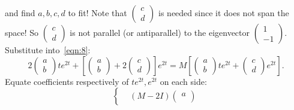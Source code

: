 \documentclass[12pt]{report}
\theoremstyle{definition}
\begin{document}
\begin{ex}
\begin{enumerate}[label = (\roman*)]
\[                \]and find $a, b, c, d$ to  fit!
                Note that $\begin{pmatrix}
                        c \\
                        d
                \end{pmatrix}$ is needed since it does not span the space!
                So $\begin{pmatrix}
                        c \\
                        d
                    \end{pmatrix}$ is not parallel (or antiparallel) to the eigenvector $\begin{pmatrix}
                            1 \\
                            -1
                    \end{pmatrix}$.
                    Substitute into~\eqref{eqn:8}:\[
                        2\begin{pmatrix}
                                a \\
                                b
                        \end{pmatrix} t e^{2t} + \left[\begin{pmatrix}
                                a \\
                                b
                        \end{pmatrix} + 2\begin{pmatrix}
                                c \\
                                d
                        \end{pmatrix} \right] e^{2t}
                        = M\left[\begin{pmatrix}
                                a \\
                                b
                        \end{pmatrix} t e^{2t} + \begin{pmatrix}
                                c \\
                                d
                        \end{pmatrix} e^{2t}\right].
                    \]
                    Equate coefficients respectively of $te^{2t}, e^{2t}$ on each side:\[
                        \left\{\begin{align*}
                            & (M - 2I)\begin{pmatrix}
                                    a \\

\end{pmatrix}
\end{align*}\]
\end{enumerate}
\end{ex}
\end{document}
